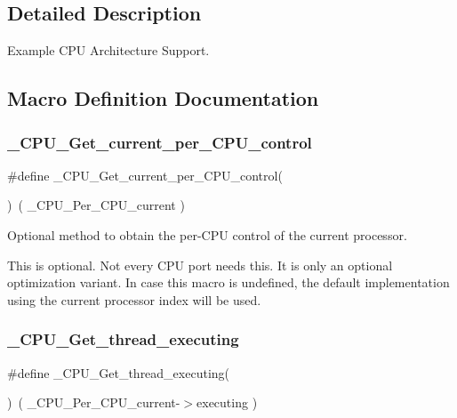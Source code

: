 \subsection{Detailed Description}
Example C\+PU Architecture Support. 



\subsection{Macro Definition Documentation}
\mbox{\label{group__RTEMSScoreCPUExample_ga026af6cb089314aa4eac9e276624953e}} 
\subsubsection{\texorpdfstring{\_CPU\_Get\_current\_per\_CPU\_control}{\_CPU\_Get\_current\_per\_CPU\_control}}
{\footnotesize\ttfamily \#define \+\_\+\+C\+P\+U\+\_\+\+Get\+\_\+current\+\_\+per\+\_\+\+C\+P\+U\+\_\+control(\begin{DoxyParamCaption}{ }\end{DoxyParamCaption})~( \+\_\+\+C\+P\+U\+\_\+\+Per\+\_\+\+C\+P\+U\+\_\+current )}



Optional method to obtain the per-\/\+C\+PU control of the current processor. 

This is optional. Not every C\+PU port needs this. It is only an optional optimization variant. In case this macro is undefined, the default implementation using the current processor index will be used. \mbox{\label{group__RTEMSScoreCPUExample_gadcdca3586eca8c4286b18312eac9087f}} 
\subsubsection{\texorpdfstring{\_CPU\_Get\_thread\_executing}{\_CPU\_Get\_thread\_executing}}
{\footnotesize\ttfamily \#define \+\_\+\+C\+P\+U\+\_\+\+Get\+\_\+thread\+\_\+executing(\begin{DoxyParamCaption}{ }\end{DoxyParamCaption})~( \+\_\+\+C\+P\+U\+\_\+\+Per\+\_\+\+C\+P\+U\+\_\+current-\/$>$executing )}



